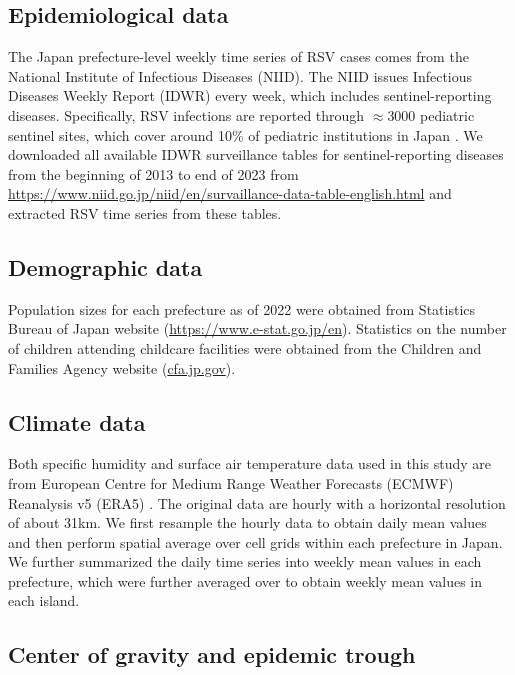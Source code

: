 \documentclass[12pt]{article}
\begin{document}
\subsection*{Epidemiological data}

The Japan prefecture-level weekly time series of RSV cases comes from the National Institute of Infectious Diseases (NIID).
The NIID issues Infectious Diseases Weekly Report (IDWR) every week, which includes sentinel-reporting diseases.
Specifically, RSV infections are reported through $\approx 3000$ pediatric sentinel sites, which cover around 10\% of pediatric institutions in Japan \citep{yamagami2019detection}.
We downloaded all available IDWR surveillance tables for sentinel-reporting diseases from the beginning of 2013 to end of 2023 from \url{https://www.niid.go.jp/niid/en/survaillance-data-table-english.html} and extracted RSV time series from these tables.

\subsection*{Demographic data}

Population sizes for each prefecture as of 2022 were obtained from Statistics Bureau of Japan website (\url{https://www.e-stat.go.jp/en}).
Statistics on the number of children attending childcare facilities were obtained from the Children and Families Agency website (\url{cfa.jp.gov}).

\subsection*{Climate data}

Both specific humidity and surface air temperature data used in this study are from European Centre for Medium Range Weather Forecasts (ECMWF) Reanalysis v5 (ERA5) \citep{hersbach2020era5}. 
The original data are hourly with a horizontal resolution of about 31km. 
We first resample the hourly data to obtain daily mean values and then perform spatial average over cell grids within each prefecture in Japan. 
We further summarized the daily time series into weekly mean values in each prefecture, which were further averaged over to obtain weekly mean values in each island.

\subsection*{Center of gravity and epidemic trough}
\end{document}
